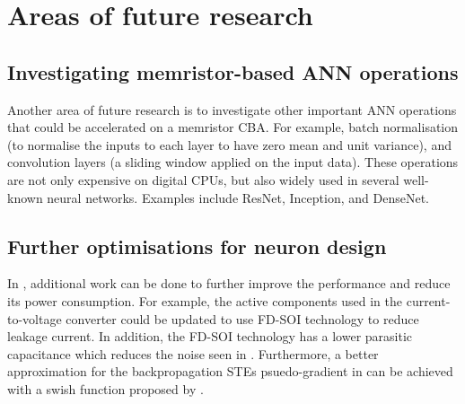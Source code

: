 

\newpage

\section{Areas of future research}

\subsection{Investigating memristor-based \ac{ANN} operations}

Another area of future research is to investigate other important \ac{ANN} operations that could be accelerated on a memristor \ac{CBA}. For example, batch normalisation (to normalise the inputs to each layer to have zero mean and unit variance), and convolution layers (a sliding window applied on the input data). These operations are not only expensive on digital \acp{CPU}, but also widely used in several well-known neural networks. Examples include ResNet, Inception, and DenseNet.

\subsection{Further optimisations for neuron design}

In , additional work can be done to further improve the performance and reduce its power consumption. For example, the active components used in the current-to-voltage converter could be updated to use FD-SOI technology to reduce leakage current. In addition, the FD-SOI technology has a lower parasitic capacitance which reduces the noise seen in . Furthermore, a better approximation for the backpropagation \acp{STE} psuedo-gradient in  can be achieved with a swish function proposed by \citet{iEECON2022} \cite{iEECON2022}.

